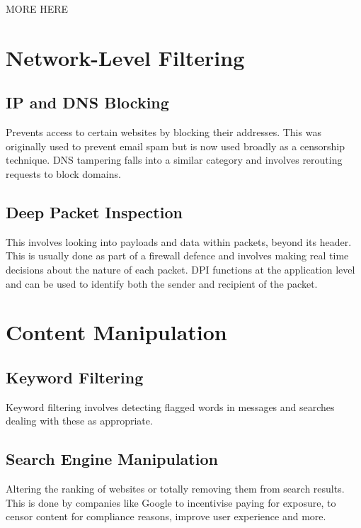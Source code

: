 MORE HERE















\section{Network-Level Filtering }
\subsection{IP and DNS Blocking}
Prevents access to certain websites by blocking their addresses. This was originally used to prevent email spam but is now used broadly as a censorship technique. DNS tampering falls into a similar category and involves rerouting requests to block domains.  
 
\subsection{Deep Packet Inspection}
This involves looking into payloads and data within packets, beyond its header. This is usually done as part of a firewall defence and involves making real time decisions about the nature of each packet. DPI functions at the application level and can be used to identify both the sender and recipient of the packet.
















\section{Content Manipulation}
\subsection{Keyword Filtering}
Keyword filtering involves detecting flagged words in messages and searches dealing with these as appropriate.  
 
\subsection{Search Engine Manipulation}
Altering the ranking of websites or totally removing them from search results. This is done by companies like Google to incentivise paying for exposure, to censor content for compliance reasons, improve user experience and more. 

